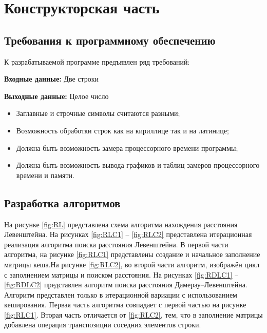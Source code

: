 \chapter{Конструкторская часть}

\section{Требования к программному обеспечению}

К разрабатываемой программе предъявлен ряд требований:

\textbf{Входные данные:} Две строки

\textbf{Выходные данные:} Целое число

\begin{itemize}
	\item Заглавные и строчные символы считаются разными;
	\item Возможность обработки строк как на кириллице так и на латинице;
	\item Должна быть возможность замера процессорного времени программы;
	\item Должна быть возможность вывода графиков и таблиц замеров процессорного времени и памяти.
\end{itemize}

\section{Разработка алгоритмов}
На рисунке \ref{fig:RL} представлена схема алгоритма нахождения расстояния Левенштейна. На рисунках \ref{fig:RLC1} – \ref{fig:RLC2} представлена итерационная реализация алгоритма поиска расстояния Левенштейна. В первой части алгоритма, на рисунке \ref{fig:RLC1} представлены создание и начальное заполнение матрицы кеша.На рисунке \ref{fig:RLC2}, во второй части алгоритм, изображён цикл с заполнением матрицы и поиском расстояния. На рисунках \ref{fig:RDLC1} – \ref{fig:RDLC2} представлен алгоритм поиска расстояния Дамерау–Левенштейна. Алгоритм представлен только в итерационной вариации с использованием кеширования. Первая часть алгоритма совпадает с первой частью на рисунке \ref{fig:RLC1}. Вторая часть отличается от \ref{fig:RLC2}, тем, что в заполнение матрицы добавлена операция транспозиции соседних элементов строки.


